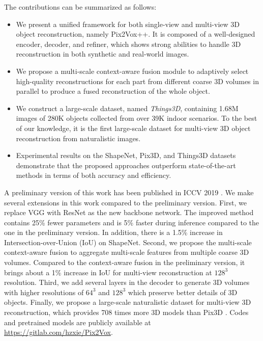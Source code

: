 \documentclass[twocolumn]{svjour3}
\begin{document}
The contributions can be summarized as follows:

\begin{itemize}
  \item We present a unified framework for both single-view and multi-view 3D object reconstruction, namely Pix2Vox++. It is composed of a well-designed encoder, decoder, and refiner, which shows strong abilities to handle 3D reconstruction in both synthetic and real-world images.
  \item We propose a multi-scale context-aware fusion module to adaptively select high-quality reconstructions for each part from different coarse 3D volumes in parallel to produce a fused reconstruction of the whole object.
  \item We construct a large-scale dataset, named {\it Things3D}, containing 1.68M images of 280K objects collected from over 39K indoor scenarios. To the best of our knowledge, it is the first large-scale dataset for multi-view 3D object reconstruction from naturalistic images.
  \item Experimental results on the ShapeNet, Pix3D, and Things3D datasets demonstrate that the proposed approaches outperform state-of-the-art methods in terms of both accuracy and efficiency.
\end{itemize}

A preliminary version of this work has been published in ICCV 2019 \citep{DBLP:conf/iccv/XieHXSS19}.
We make several extensions in this work compared to the preliminary version.
First, we replace VGG \citep{DBLP:conf/iclr/SimonyanZ14a} with ResNet \citep{DBLP:conf/cvpr/HeZRS16} as the new backbone network.
The improved method contains 25\% fewer parameters and is 5\% faster during inference compared to the one in the preliminary version.
In addition, there is a 1.5\% increase in Intersection-over-Union (IoU) on ShapeNet.
Second, we propose the multi-scale context-aware fusion to aggregate multi-scale features from multiple coarse 3D volumes.
Compared to the context-aware fusion in the preliminary version, it brings about a 1\% increase in IoU for multi-view reconstruction at $128^3$ resolution.
Third, we add several layers in the decoder to generate 3D volumes with higher resolutions of $64^3$ and $128^3$ which preserve better details of 3D objects.
Finally, we propose a large-scale naturalistic dataset for multi-view 3D reconstruction, which provides 708 times more 3D models than Pix3D \citep{DBLP:conf/cvpr/Sun0ZZZXTF18}.
Codes and pretrained models are publicly available at 
\url{https://gitlab.com/hzxie/Pix2Vox}.
\end{document}
